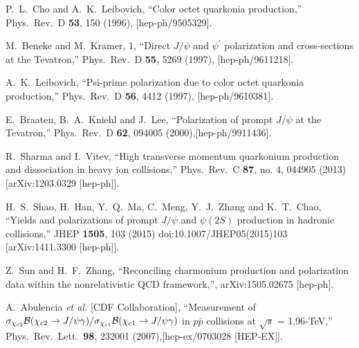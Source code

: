 \documentclass[aps,prc,preprint,superscriptaddress,showpacs,showkeys,amsmath]{revtex4-1}
\begin{document}
\noindent
\begin{thebibliography}{100}
\medskip



  P.~L.~Cho and A.~K.~Leibovich,
  ``Color octet quarkonia production,''
  Phys.\ Rev.\ D {\bf 53}, 150 (1996),
  [hep-ph/9505329].

  M.~Beneke and M.~Kramer, 1,
  ``Direct $J/\psi$ and $\psi^\prime$ polarization and cross-sections at the Tevatron,''
  Phys.\ Rev.\ D {\bf 55}, 5269 (1997), [hep-ph/9611218].

  A.~K.~Leibovich,
  ``Psi-prime polarization due to color octet quarkonia production,''
  Phys.\ Rev.\ D {\bf 56}, 4412 (1997), [hep-ph/9610381].

  E.~Braaten, B.~A.~Kniehl and J.~Lee,
  ``Polarization of prompt $J/\psi$ at the Tevatron,''
  Phys.\ Rev.\ D {\bf 62}, 094005 (2000),[hep-ph/9911436].

  R.~Sharma and I.~Vitev,
  ``High transverse momentum quarkonium production and dissociation in heavy ion collisions,''
  Phys.\ Rev.\ C {\bf 87}, no. 4, 044905 (2013)
  [arXiv:1203.0329 [hep-ph]].


  H.~S.~Shao, H.~Han, Y.~Q.~Ma, C.~Meng, Y.~J.~Zhang and K.~T.~Chao,
  ``Yields and polarizations of prompt $J/\psi$ and $\psi(2S)$ production in hadronic collisions,''
  JHEP {\bf 1505}, 103 (2015)
  doi:10.1007/JHEP05(2015)103
  [arXiv:1411.3300 [hep-ph]].


  Z.~Sun and H.~F.~Zhang,
  ``Reconciling charmonium production and polarization data within the nonrelativistic QCD framework,'',
  arXiv:1505.02675 [hep-ph].


  A.~Abulencia {\it et al.} [CDF Collaboration],
  ``Measurement of $\sigma_{\chi_{c2}}{\cal B}(\chi_{c2} \to J/\psi \gamma)/\sigma_{\chi_{c1}} {\cal B}(\chi_{c1} \to J/\psi \gamma)$ 
  in $p \bar{p}$ collisions at $\sqrt{s}$ = 1.96-TeV,''
  Phys.\ Rev.\ Lett.\  {\bf 98}, 232001 (2007),[hep-ex/0703028 [HEP-EX]].


\end{thebibliography}
\end{document}
